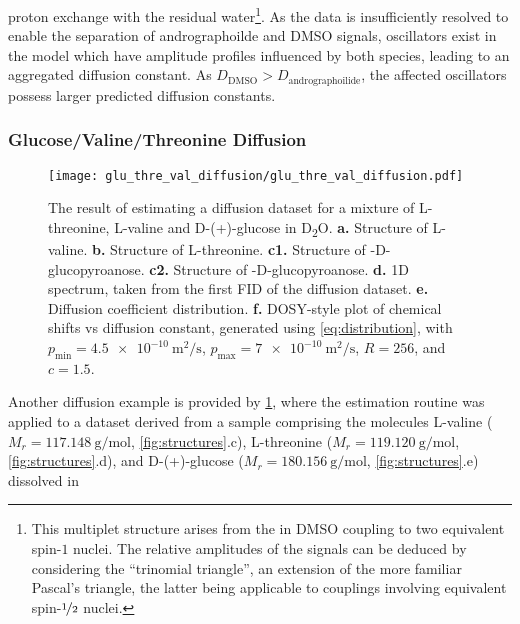 proton exchange with the residual water\footnote{
    This multiplet structure arises from the  in \acs{DMSO} coupling to
    two
    equivalent spin-$1$  nuclei. The relative amplitudes of the signals
    can be deduced by considering the ``trinomial triangle'', an extension of
    the more familiar Pascal's triangle, the latter being applicable to
    couplings involving equivalent spin-$\nicefrac{1}{2}$ nuclei.
}. As the
data is insufficiently resolved to enable the separation of andrographoilde and
\acs{DMSO} signals, oscillators exist in the model which have amplitude profiles
influenced by both species, leading to an aggregated diffusion constant. As
$D_{\text{DMSO}} > D_{\text{andrographoilide}}$, the affected oscillators
possess larger predicted diffusion constants.

\subsubsection{Glucose/Valine/Threonine Diffusion}
\begin{figure}
    \centering
    \texttt{[image: glu\_thre\_val\_diffusion/glu\_thre\_val\_diffusion.pdf]}
    \caption[
        The result of estimating a diffusion dataset for a mixture of L-threonine,
        L-valine and D-(+)-glucose.
    ]{
        The result of estimating a diffusion dataset for a mixture of L-threonine,
        L-valine and D-(+)-glucose in D\textsubscript{2}O.
        \textbf{a.} Structure of L-valine.
        \textbf{b.} Structure of L-threonine.
        \textbf{c1.} Structure of \textalpha-D-glucopyroanose.
        \textbf{c2.} Structure of \textbeta-D-glucopyroanose.
        \textbf{d.} \acs{1D} spectrum, taken from the first \acs{FID} of the
        diffusion dataset.
        \textbf{e.} Diffusion coefficient distribution.
        \textbf{f.} \acs{DOSY}-style plot of chemical shifts vs diffusion
        constant, generated using \cref{eq:distribution}, with
        $p_{\text{min}} = \qty{4.5e-10}{\meter\squared\per\second}$,
        $p_{\text{max}} = \qty{7e-10}{\meter\squared\per\second}$,
        $R=256$, and $c=1.5$.
    }
    \label{fig:gluc_val_thre}
\end{figure}
Another diffusion example is provided by \cref{fig:gluc_val_thre}, where the
estimation routine was applied to a dataset derived from a sample comprising
the molecules L-valine ($M_r = \qty{117.148}{\gram\per\mole}$,
\cref{fig:structures}.c), L-threonine
($M_r = \qty{119.120}{\gram\per\mole}$, \cref{fig:structures}.d), and D-(+)-glucose ($M_r =
\qty{180.156}{\gram\per\mole}$, \cref{fig:structures}.e) dissolved in
